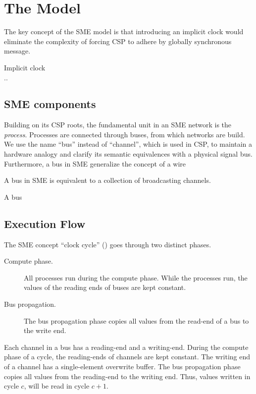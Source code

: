 \section{The Model}
The key concept of the SME model is that introducing an implicit clock would
eliminate the complexity of forcing CSP to adhere by globally synchronous
message. 

\begin{description}
\item [Implicit clock]
\item[..]
\end{description}

\subsection{SME components}
Building on its CSP roots, the fundamental unit in an SME network is the
{\itshape process}. Processes are connected through buses, from which networks
are build. We use the name ``bus'' instead of ``channel'', which is used in CSP,
to maintain a hardware analogy and clarify its semantic equivalences with a
physical signal bus. Furthermore, a bus in SME generalize the concept of a wire

A bus in SME is equivalent to a collection of broadcasting channels.

A bus


\subsection{Execution Flow}
The SME concept ``clock cycle'' () goes through two distinct
phases.
\begin{description}
\item[Compute phase.] All processes run during the compute phase. While the
  processes run, the values of the reading ends of buses are kept constant. 
\item[Bus propagation.] The bus propagation phase copies all values from the
  read-end of a bus to the write end.
\end{description}

Each channel in a bus has a reading-end and a writing-end. During the compute
phase of a cycle, the reading-ends of channels are kept constant. The writing
end of a channel has a single-element overwrite buffer. The bus propagation
phase copies all values from the reading-end to the writing end. Thus, values
written in cycle $c$, will be read in cycle $c+1$.

